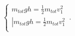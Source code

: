 \begin{equation}
    \begin{cases}
      m_{tot} g h = \frac{1}{2} m_{tot} v_1^2\\
      \left\lvert m_{tot} g h = \frac{1}{2} m_{tot} v_1^2\\
    \end{cases}\,.
\end{equation}